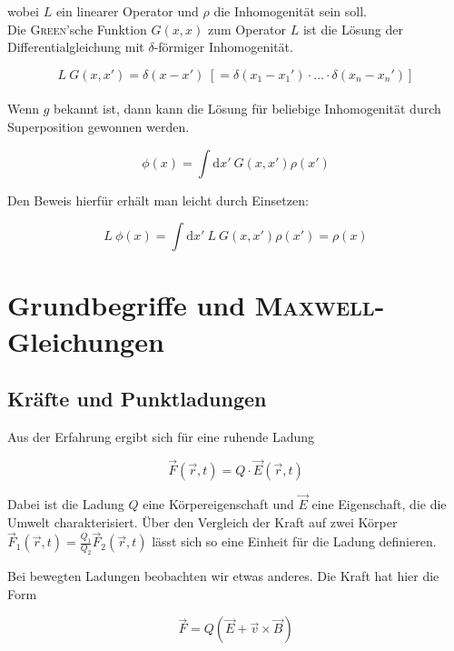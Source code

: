wobei $L$ ein linearer Operator und $\rho$ die Inhomogenität sein soll.\
\\
Die \textsc{Green}'sche Funktion $G(x,x)$ zum Operator $L$ ist die Lösung der Differentialgleichung mit $\delta$-förmiger Inhomogenität.

\begin{equation*}
L \ G(x,x') = \delta (x-x') \; [= \delta(x_1-x_1')\cdot\dotsc\cdot\delta(x_n - x_n')]
\end{equation*}
\ \\
Wenn $g$ bekannt ist, dann kann die Lösung für beliebige Inhomogenität durch Superposition gewonnen werden.

\begin{equation*}
\phi (x) = \int\mathrm{d}x' \ G(x,x') \rho(x')
\end{equation*}

Den Beweis hierfür erhält man leicht durch Einsetzen:

\begin{equation*}
L \ \phi(x) = \int\mathrm{d}x' \ L \ G(x,x') \rho(x') = \rho(x)
\end{equation*}


\chapter{Grundbegriffe und \textsc{Maxwell}-Gleichungen}
\section{Kräfte und Punktladungen}

Aus der Erfahrung ergibt sich für eine ruhende Ladung

\begin{equation*}
\vec{F}(\vec{r},t)=Q\cdot\vec{E}(\vec{r},t)
\end{equation*}

Dabei ist die Ladung $Q$ eine Körpereigenschaft und $\vec{E}$ eine Eigenschaft, die die Umwelt charakterisiert. Über den Vergleich der Kraft auf zwei Körper $\vec{F}_1(\vec{r},t)=\frac{Q_1}{Q_2}\vec{F}_2(\vec{r},t)$ lässt sich so eine Einheit für die Ladung definieren.\\
\linebreak

Bei bewegten Ladungen beobachten wir etwas anderes. Die Kraft hat hier die Form

\begin{equation*}
\vec{F}=Q(\vec{E}+\vec{v}\times\vec{B})
\end{equation*}

